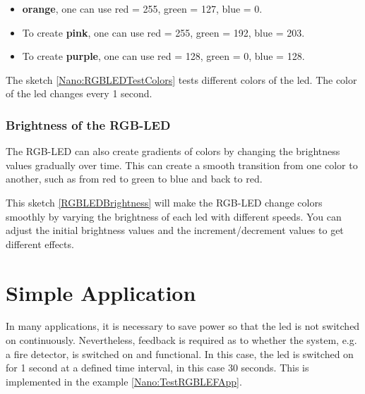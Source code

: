 \begin{itemize}
    \item \textbf{orange}, one can use red = 255, green = 127, blue = 0. 
    \item To create \textbf{pink}, one can use red = 255, green = 192, blue = 203. 
    \item To create \textbf{purple}, one can use red = 128, green = 0, blue = 128. 
\end{itemize}


\bigskip

The sketch \ref{Nano:RGBLEDTestColors} tests different colors of the \ac{led}. The color of the \ac{led} changes every 1 second.

{
  \label{Nano:RGBLEDTestColors}

}



\subsubsection{Brightness of the RGB-LED}

The RGB-LED can also create gradients of colors by changing the brightness values gradually over time. This can create a smooth transition from one color to another, such as from red to green to blue and back to red.

This sketch \ref{RGBLEDBrightness} will make the RGB-LED change colors smoothly by varying the brightness of each \ac{led} with different speeds. You can adjust the initial brightness values and the increment/decrement values to get different effects.


{
   \label{RGBLEDBrightness}
}


\section{Simple Application}

In many applications, it is necessary to save power so that the \ac{led} is not switched on continuously. Nevertheless, feedback is required as to whether the system, e.g. a fire detector, is switched on and functional. In this case, the \ac{led} is switched on for 1 second at a defined time interval, in this case 30 seconds. This is implemented in the example \ref{Nano:TestRGBLEFApp}.

